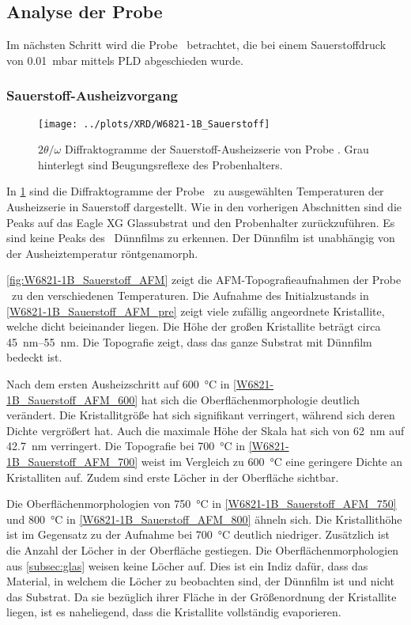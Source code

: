 \subsection{Analyse der Probe \sampleone}\label{subsec:probe-W6821-1}
Im nächsten Schritt wird die Probe \sampleone\ betrachtet, die bei einem Sauerstoffdruck von \qty{0.01}{\milli\bar}
mittels PLD abgeschieden wurde.

\subsubsection{Sauerstoff-Aus\-heiz\-vor\-gang}\label{subsubsec:W6821-1B_Sauerstoff}
\begin{figure}
    \centering
    \texttt{[image: ../plots/XRD/W6821-1B\_Sauerstoff]}
    \caption{$2\theta/\omega$ Diffraktogramme der Sauerstoff-Ausheizserie von Probe \sampleone.
    Grau hinterlegt sind Beugungsreflexe des Probenhalters.}
    \label{fig:W6821-1B_Sauerstoff_XRD}
\end{figure}
In \cref{fig:W6821-1B_Sauerstoff_XRD} sind die Diffraktogramme der Probe \sampleone\ zu ausgewählten
Temperaturen der Ausheizserie in Sauerstoff dargestellt.
Wie in den vorherigen Abschnitten sind die Peaks auf das Eagle XG Glassubstrat und den Probenhalter zurückzuführen.
Es sind keine Peaks des \heo\ Dünnfilms zu erkennen.
Der Dünnfilm ist unabhängig von der Ausheiztemperatur röntgenamorph.

\cref{fig:W6821-1B_Sauerstoff_AFM} zeigt die AFM-Topografieaufnahmen der Probe \sampleone\ zu den verschiedenen
Temperaturen.
Die Aufnahme des Initialzustands in \cref{W6821-1B_Sauerstoff_AFM_pre} zeigt viele zufällig angeordnete Kristallite,
welche dicht beieinander liegen.
Die Höhe der großen Kristallite beträgt circa \qtyrange{45}{55}{\nano\meter}.
Die Topografie zeigt, dass das ganze Substrat mit Dünnfilm bedeckt ist.

Nach dem ersten Ausheizschritt auf \qty{600}{\degreeCelsius} in \cref{W6821-1B_Sauerstoff_AFM_600} hat sich die
Oberflächenmorphologie deutlich verändert.
Die Kristallitgröße hat sich signifikant verringert, während sich deren Dichte vergrößert hat.
Auch die maximale Höhe der Skala hat sich von \qty{62}{\nano\meter} auf \qty{42.7}{\nano\meter} verringert.
Die Topografie bei \qty{700}{\degreeCelsius} in \cref{W6821-1B_Sauerstoff_AFM_700} weist im Vergleich zu
\qty{600}{\degreeCelsius} eine geringere Dichte an Kristalliten auf.
Zudem sind erste Löcher in der Oberfläche sichtbar.

Die Oberflächenmorphologien von \qty{750}{\degreeCelsius} in \cref{W6821-1B_Sauerstoff_AFM_750} und
\qty{800}{\degreeCelsius} in \cref{W6821-1B_Sauerstoff_AFM_800} ähneln sich.
Die Kristallithöhe ist im Gegensatz zu der Aufnahme bei \qty{700}{\degreeCelsius} deutlich niedriger.
Zusätzlich ist die Anzahl der Löcher in der Oberfläche gestiegen.
Die Oberflächenmorphologien aus \cref{subsec:glas} weisen keine Löcher auf.
Dies ist ein Indiz dafür, dass das Material, in welchem die Löcher zu beobachten sind, der Dünnfilm ist
und nicht das Substrat.
Da sie bezüglich ihrer Fläche in der Größenordnung der Kristallite liegen, ist es naheliegend, dass die Kristallite
vollständig evaporieren.

